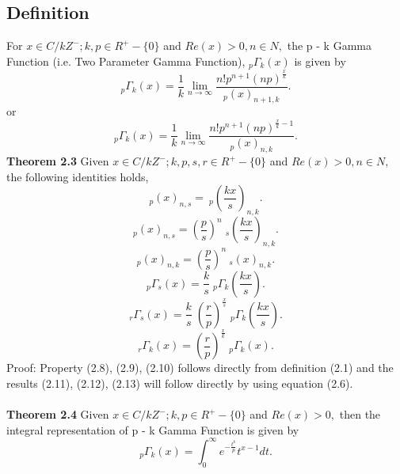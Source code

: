 \documentclass[11pt,a4paper]{article}
\numberwithin{equation}{section}
\begin{document}
\subsection{Definition}
For $ x\in C/kZ^{-};  k,p \in R^{+}-\lbrace 0 \rbrace $ and $ Re(x)>0, n\in N, $ the p - k Gamma Function (i.e. Two Parameter Gamma Function), $_{p}\Gamma_{k}(x)$ is given by
\begin{equation}
   _{p}\Gamma_{k}(x)=\frac{1}{k}\lim_{n\rightarrow \infty} \dfrac{n!p^{n+1}(np)^{\frac{x}{k}}}{_{p}(x)_{n+1,k}}.
\end{equation}  
 or
\begin{equation}
   _{p}\Gamma_{k}(x)=\frac{1}{k}\lim_{n\rightarrow \infty} \dfrac{n!p^{n+1}(np)^{\frac{x}{k}-1}}{_{p}(x)_{n,k}}.
\end{equation} 
\textbf{Theorem 2.3} Given $ x\in C/kZ^{-} ;  k,p,s,r \in R^{+}-\lbrace 0 \rbrace $ and $ Re(x)>0, n\in N, $ the following identities holds,
\begin{equation}
 _{p}(x)_{n,s}= \:_{p}(\frac{kx}{s})_{n,k}.
\end{equation}
\begin{equation}
 _{p}(x)_{n,s}= (\frac{p}{s})^{n} \; _{s}(\frac{kx}{s})_{n,k}.
\end{equation}
\begin{equation}
 _{p}(x)_{n,k}= (\frac{p}{s})^{n}\:_{s}(x)_{n,k}.
\end{equation}
\begin{equation}
 _{p}\Gamma_{s}(x)= \frac{k}{s} \; _{p}\Gamma_{k}(\frac{kx}{s}).
 \end{equation} 
\begin{equation}
 _{r}\Gamma_{s}(x)= \frac{k}{s} \;(\frac{r}{p})^{\frac{x}{s}}\; _{p}\Gamma_{k}(\frac{kx}{s}).
 \end{equation} 
 \begin{equation}
 _{r}\Gamma_{k}(x)= (\frac{r}{p})^{\frac{x}{k}}\; _{p}\Gamma_{k}(x).
 \end{equation}
 Proof: Property (2.8), (2.9), (2.10) follows directly from definition (2.1) and the results (2.11), (2.12), (2.13) will follow directly  by using equation (2.6).\\\\
\textbf{Theorem 2.4} Given $ x\in C / kZ^{-}; k,p\in R^{+}-\lbrace 0 \rbrace $ and $ Re(x)>0, $
then the integral representation of p - k Gamma Function is given by
\begin{equation}
_{p}\Gamma_{k}(x)=\int^{\infty}_{0}e^{-\frac{t^{k}}{p}}t^{x-1}dt.
 \end{equation} 
\end{document}
